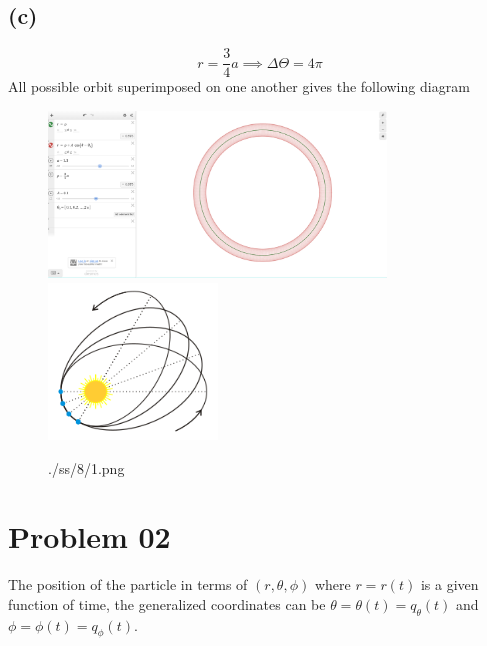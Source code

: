 \documentclass[letter, 10pts]{article}
\begin{document}
\subsection*{(c)} 
\[
r = \frac{3}{4}a  \implies \Delta \Theta = 4 \pi
\]
All possible orbit superimposed on one another gives the following diagram
\begin{figure}[H]
	\centering
	\includegraphics[width=0.8\textwidth]{./ss/8/1.png}
	\includegraphics[width=0.4\textwidth]{./ss/8/2.png}
	\caption{./ss/8/1.png}
	\label{fig:-ss-8-1-png}
\end{figure}

\section*{Problem 02} 
The position of the particle in terms of $(r,\theta, \phi)$ where $r = r(t)$ is a given function of time, the generalized coordinates can be $\theta = \theta(t) = q_\theta(t)$ and $\phi = \phi(t) = q_\phi(t)$. 
\end{document}
